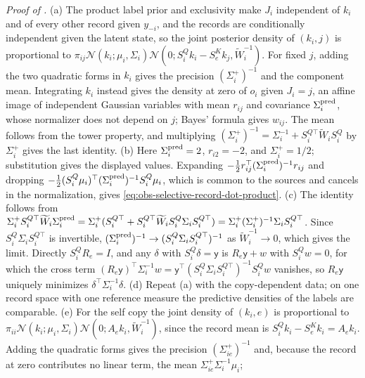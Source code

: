 \noindent\emph{Proof of .}
(a) The product label prior and exclusivity make \(J_i\) independent of \(k_i\)
and of every other record given \(y_{-i}\), and the records are conditionally
independent given the latent state, so the joint posterior density of
\((k_i,j)\) is proportional to \(\pi_{ij}\mathcal N(k_i;\mu_i,\Sigma_i)
\mathcal N(0;S^Q_ik_i-S^K_ek_j,\widetilde W_i^{-1})\). For fixed \(j\), adding
the two quadratic forms in \(k_i\) gives the precision \((\Sigma_i^+)^{-1}\) and
the component mean. Integrating \(k_i\) instead gives the density at zero of
\(o_i\) given \(J_i=j\), an affine image of independent Gaussian variables with
mean \(r_{ij}\) and covariance \(\Sigma_i^{\rm pred}\), whose normalizer does
not depend on \(j\); Bayes' formula gives \(w_{ij}\). The mean follows from the
tower property, and multiplying
\((\Sigma_i^+)^{-1}=\Sigma_i^{-1}+S_i^{Q\top}\widetilde W_iS^Q_i\) by
\(\Sigma_i^+\) gives the last identity. (b) Here \(\Sigma_i^{\rm pred}=2\),
\(r_{i2}=-2\), and \(\Sigma_i^+=1/2\); substitution gives the displayed values.
Expanding \(-\frac12r_{ij}^\top(\Sigma_i^{\rm pred})^{-1}r_{ij}\) and dropping
\(-\frac12(S^Q_i\mu_i)^\top(\Sigma_i^{\rm pred})^{-1}S^Q_i\mu_i\), which is
common to the sources and cancels in the normalization, gives
\eqref{eq:obs-selective-record-dot-product}.
(c) The identity follows from
\(\Sigma_i^+S_i^{Q\top}\widetilde W_i\Sigma_i^{\rm pred}
=\Sigma_i^+(S_i^{Q\top}+S_i^{Q\top}\widetilde W_iS^Q_i\Sigma_iS_i^{Q\top})
=\Sigma_i^+(\Sigma_i^+)^{-1}\Sigma_iS_i^{Q\top}\). Since
\(S^Q_i\Sigma_iS_i^{Q\top}\) is invertible,
\((\Sigma_i^{\rm pred})^{-1}\to(S^Q_i\Sigma_iS_i^{Q\top})^{-1}\) as
\(\widetilde W_i^{-1}\to0\), which gives the limit. Directly \(S^Q_iR_e=I\), and
any \(\delta\) with \(S^Q_i\delta=\mathsf y\) is \(R_e\mathsf y+w\) with
\(S^Q_iw=0\), for which the cross term
\((R_e\mathsf y)^\top\Sigma_i^{-1}w=\mathsf y^\top(S^Q_i\Sigma_iS_i^{Q\top})^{-1}S^Q_iw\)
vanishes, so \(R_e\mathsf y\) uniquely minimizes \(\delta^\top\Sigma_i^{-1}\delta\).
(d) Repeat (a) with the copy-dependent data; on one record space with one
reference measure the predictive densities of the labels are comparable.
(e) For the self copy the joint density of \((k_i,e)\) is proportional to
\(\pi_{ii}\mathcal N(k_i;\mu_i,\Sigma_i)\mathcal N(0;A_ek_i,\widetilde W_i^{-1})\),
since the record mean is \(S^Q_ik_i-S^K_ek_i=A_ek_i\). Adding the quadratic
forms gives the precision \((\Sigma_{ie}^+)^{-1}\) and, because the record at
zero contributes no linear term, the mean \(\Sigma_{ie}^+\Sigma_i^{-1}\mu_i\);
